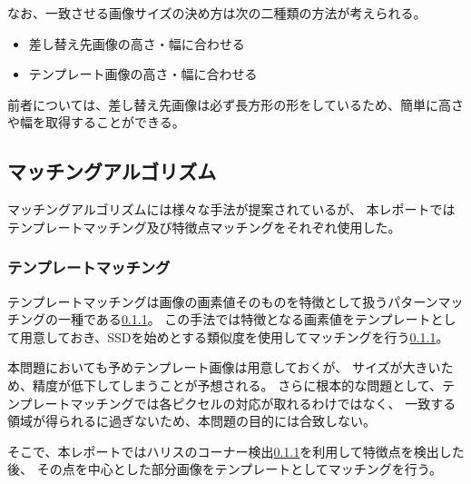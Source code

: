 なお、一致させる画像サイズの決め方は次の二種類の方法が考えられる。
\begin{itemize}
    \item 差し替え先画像の高さ・幅に合わせる
    \item テンプレート画像の高さ・幅に合わせる
\end{itemize}
前者については、差し替え先画像は必ず長方形の形をしているため、簡単に高さや幅を取得することができる。


\subsection{マッチングアルゴリズム}
マッチングアルゴリズムには様々な手法が提案されているが、
本レポートではテンプレートマッチング及び特徴点マッチングをそれぞれ使用した。

\subsubsection{テンプレートマッチング}
テンプレートマッチングは画像の画素値そのものを特徴として扱うパターンマッチングの一種である\ref{}。
この手法では特徴となる画素値をテンプレートとして用意しておき、SSDを始めとする類似度を使用してマッチングを行う\ref{}。

本問題においても予めテンプレート画像は用意しておくが、
サイズが大きいため、精度が低下してしまうことが予想される。
さらに根本的な問題として、テンプレートマッチングでは各ピクセルの対応が取れるわけではなく、
一致する領域が得られるに過ぎないため、本問題の目的には合致しない。

そこで、本レポートではハリスのコーナー検出\ref{}を利用して特徴点を検出した後、
その点を中心とした部分画像をテンプレートとしてマッチングを行う。

